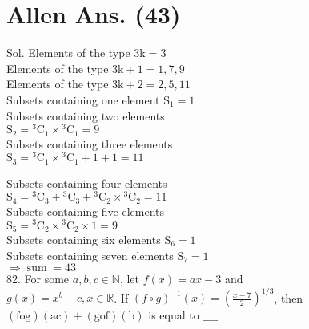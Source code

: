 \documentclass[10pt]{article}
\begin{document}
\section*{Allen Ans. (43)}
Sol. Elements of the type \(3 \mathrm{k}=3\)\\
Elements of the type \(3 \mathrm{k}+1=1,7,9\)\\
Elements of the type \(3 \mathrm{k}+2=2,5,11\)\\
Subsets containing one element \(\mathrm{S}_{1}=1\)\\
Subsets containing two elements\\
\(\mathrm{S}_{2}={ }^{3} \mathrm{C}_{1} \times{ }^{3} \mathrm{C}_{1}=9\)\\
Subsets containing three elements\\
\(\mathrm{S}_{3}={ }^{3} \mathrm{C}_{1} \times{ }^{3} \mathrm{C}_{1}+1+1=11\)

Subsets containing four elements\\
\(\mathrm{S}_{4}={ }^{3} \mathrm{C}_{3}+{ }^{3} \mathrm{C}_{3}+{ }^{3} \mathrm{C}_{2} \times{ }^{3} \mathrm{C}_{2}=11\)\\
Subsets containing five elements\\
\(\mathrm{S}_{5}={ }^{3} \mathrm{C}_{2} \times{ }^{3} \mathrm{C}_{2} \times 1=9\)\\
Subsets containing six elements \(\mathrm{S}_{6}=1\)\\
Subsets containing seven elements \(\mathrm{S}_{7}=1\)\\
\(\Rightarrow \operatorname{sum}=43\)\\
82. For some \(a, b, c \in \mathbb{N}\), let \(f(x)=a x-3\) and\\
\(g(x)=x^{b}+c, x \in \mathbb{R}\). If \((f \circ g)^{-1}(x)=\left(\frac{x-7}{2}\right)^{1 / 3}\), then \((\mathrm{fog})(\mathrm{ac})+(\mathrm{gof})(\mathrm{b})\) is equal to \(\_\_\_\_\) .
\end{document}
